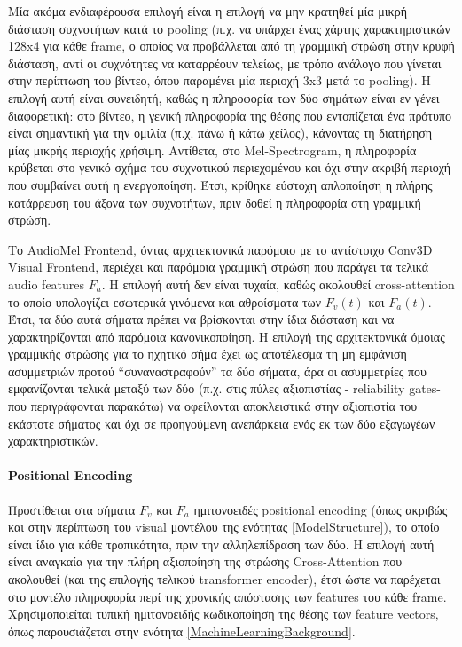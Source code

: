 Μία ακόμα ενδιαφέρουσα επιλογή είναι η επιλογή να μην κρατηθεί μία μικρή διάσταση συχνοτήτων κατά το pooling (π.χ. να υπάρχει ένας χάρτης χαρακτηριστικών 128x4 για κάθε frame, ο οποίος να προβάλλεται από τη γραμμική στρώση στην κρυφή διάσταση, αντί οι συχνότητες να καταρρέουν τελείως, με τρόπο ανάλογο που γίνεται στην περίπτωση του βίντεο, όπου παραμένει μία περιοχή 3x3 μετά το pooling). Η επιλογή αυτή είναι συνειδητή, καθώς η πληροφορία των δύο σημάτων είναι εν γένει διαφορετική: στο βίντεο, η γενική πληροφορία της θέσης που εντοπίζεται ένα πρότυπο είναι σημαντική για την ομιλία (π.χ. πάνω ή κάτω χείλος), κάνοντας τη διατήρηση μίας μικρής περιοχής χρήσιμη. Αντίθετα, στο Mel-Spectrogram, η πληροφορία κρύβεται στο γενικό σχήμα του συχνοτικού περιεχομένου και όχι στην ακριβή περιοχή που συμβαίνει αυτή η ενεργοποίηση. Έτσι, κρίθηκε εύστοχη απλοποίηση η πλήρης κατάρρευση του άξονα των συχνοτήτων, πριν δοθεί η πληροφορία στη γραμμική στρώση.

Το AudioMel Frontend, όντας αρχιτεκτονικά παρόμοιο με το αντίστοιχο Conv3D Visual Frontend, περιέχει και παρόμοια γραμμική στρώση που παράγει τα τελικά audio features $F_a$. Η επιλογή αυτή δεν είναι τυχαία, καθώς ακολουθεί cross-attention το οποίο υπολογίζει εσωτερικά γινόμενα και αθροίσματα των $F_v(t)$ και $F_a(t)$. Έτσι, τα δύο αυτά σήματα πρέπει να βρίσκονται στην ίδια διάσταση και να χαρακτηρίζονται από παρόμοια κανονικοποίηση. Η επιλογή της αρχιτεκτονικά όμοιας γραμμικής στρώσης για το ηχητικό σήμα έχει ως αποτέλεσμα τη μη εμφάνιση ασυμμετριών προτού ``συναναστραφούν'' τα δύο σήματα, άρα οι ασυμμετρίες που εμφανίζονται τελικά μεταξύ των δύο (π.χ. στις πύλες αξιοπιστίας - reliability gates- που περιγράφονται παρακάτω) να οφείλονται αποκλειστικά στην αξιοπιστία του εκάστοτε σήματος και όχι σε προηγούμενη ανεπάρκεια ενός εκ των δύο εξαγωγέων χαρακτηριστικών.

\paragraph{Positional Encoding}
Προστίθεται στα σήματα $F_v$ και $F_a$ ημιτονοειδές positional encoding (όπως ακριβώς και στην περίπτωση του visual μοντέλου της ενότητας \ref{ModelStructure}), το οποίο είναι ίδιο για κάθε τροπικότητα, πριν την αλληλεπίδραση των δύο. Η επιλογή αυτή είναι αναγκαία για την πλήρη αξιοποίηση της στρώσης Cross-Attention που ακολουθεί (και της επιλογής τελικού transformer encoder), έτσι ώστε να παρέχεται στο μοντέλο πληροφορία περί της χρονικής απόστασης των features του κάθε frame. Χρησιμοποιείται τυπική ημιτονοειδής κωδικοποίηση της θέσης των feature vectors, όπως παρουσιάζεται στην ενότητα \ref{MachineLearningBackground}.

